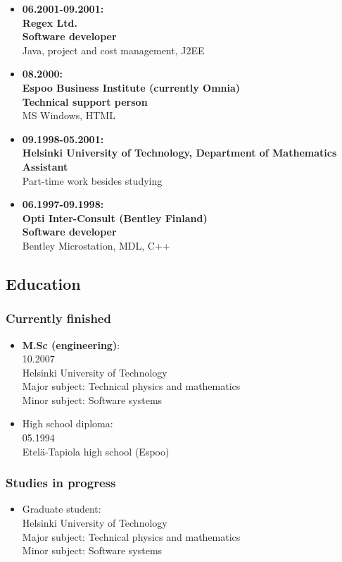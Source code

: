 \documentclass[a4paper,12pt]{article}
\begin{document}
\begin{itemize}
{Consultant} \\
Technical support for Informatica \\
Informatica, Oracle, (Business Objects)
\item
{\bf 06.2001-09.2001:\\
Regex Ltd. \\
Software developer} \\
Java, project and cost management, J2EE
\item
{\bf 08.2000:\\
Espoo Business Institute (currently Omnia) \\
Technical support person} \\
MS Windows, HTML
\item
{\bf 09.1998-05.2001:\\
Helsinki University of Technology, Department of Mathematics \\
Assistant} \\
Part-time work besides studying
\item
{\bf 06.1997-09.1998:\\
Opti Inter-Consult (Bentley Finland)\\
Software developer} \\
Bentley Microstation, MDL, C++
\end{itemize}

\subsection*{Education}

\subsubsection*{Currently finished}
\begin{itemize}
\item
{\bf M.Sc (engineering)}: \\
10.2007 \\
Helsinki University of Technology \\
Major subject: Technical physics and mathematics \\
Minor subject: Software systems
\item
High school diploma: \\
05.1994 \\
Etel\"a-Tapiola high school (Espoo)
\end{itemize}

\subsubsection*{Studies in progress}
\begin{itemize}
\item
Graduate student: \\
Helsinki University of Technology \\
Major subject: Technical physics and mathematics \\
Minor subject: Software systems
\end{itemize}
\end{document}
